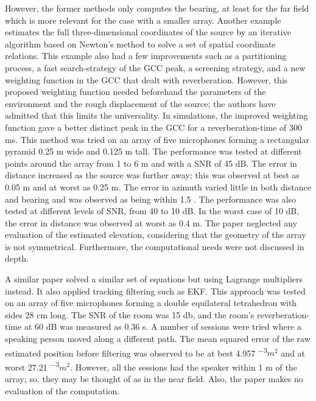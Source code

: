 \documentclass{report}
\newcommand{\e}[1]{\times 10^{#1}}
\begin{document}
However, the former methods only computes the bearing, at least for the far field which is more relevant for the case with a smaller array. Another example \cite{chen_sound_2019} estimates the full three-dimensional coordinates of the source by an iterative algorithm based on Newton's method to solve a set of spatial coordinate relations. This example also had a few improvements such as a partitioning process, a fast search-strategy of the GCC peak, a screening strategy, and a new weighting function in the GCC that dealt with reverberation. However, this proposed weighting function needed beforehand the parameters of the environment and the rough displacement of the source; the authors have admitted that this limits the universality. In simulations, the improved weighting function gave a better distinct peak in the GCC for a reverberation-time of 300 \si{ms}. This method was tried on an array of five microphones forming a rectangular pyramid 0.25 \si{m} wide and 0.125 \si{m} tall. The performance was tested at different points around the array from 1 to 6 \si{m} and with a SNR of 45 \si{dB}. The error in distance increased as the source was further away; this was observed at best as 0.05 \si{m} and at worst as 0.25 \si{m}. The error in azimuth varied little in both distance and bearing and was observed as being within 1.5 \si{\deg}. The performance was also tested at different levels of SNR, from 40 to 10 \si{dB}. In the worst case of 10 \si{dB}, the error in distance was observed at worst as 0.4 \si{m}. The paper neglected any evaluation of the estimated elevation, considering that the geometry of the array is not symmetrical. Furthermore, the computational needs were not discussed in depth.

A similar paper \cite{bechler_system_2004} solved a similar set of equations but using Lagrange multipliers instead. It also applied tracking filtering such as EKF. This approach was tested on an array of five microphones forming a double equilateral tetrahedron with sides 28 \si{cm} long. The SNR of the room was 15 \si{db}, and the room's reverberation-time at 60 \si{dB} was measured as 0.36 \si{s}. A number of sessions were tried where a speaking person moved along a different path. The mean squared error of the raw estimated position before filtering was observed to be at best 4.957 \si{\e{-3}}{$m^2$} and at worst 27.21 \si{\e{-3}}{$m^2$}. However, all the sessions had the speaker within 1 \si{m} of the array; so, they may be thought of as in the near field. Also, the paper makes no evaluation of the computation.
\end{document}

